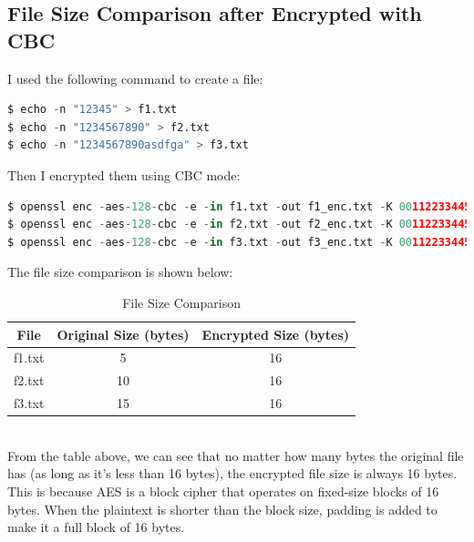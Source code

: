 \documentclass{article}
\begin{document}
\subsection{File Size Comparison after Encrypted with CBC}
I used the following command to create a file:
\begin{lstlisting}[language=Python]
$ echo -n "12345" > f1.txt
$ echo -n "1234567890" > f2.txt
$ echo -n "1234567890asdfga" > f3.txt
\end{lstlisting}
Then I encrypted them using CBC mode:
\begin{lstlisting}[language=Python]
$ openssl enc -aes-128-cbc -e -in f1.txt -out f1_enc.txt -K 00112233445566778889aabbccddeeff -iv 0102030405060708090a0b0c0d0e0f10
$ openssl enc -aes-128-cbc -e -in f2.txt -out f2_enc.txt -K 00112233445566778889aabbccddeeff -iv 0102030405060708090a0b0c0d0e0f10
$ openssl enc -aes-128-cbc -e -in f3.txt -out f3_enc.txt -K 00112233445566778889aabbccddeeff -iv 0102030405060708090a0b0c0d0e0f10
\end{lstlisting}
The file size comparison is shown below:
\begin{table}[h]
\centering
\begin{tabular}{|c|c|c|}
\hline
\textbf{File} & \textbf{Original Size (bytes)} & \textbf{Encrypted Size (bytes)} \\
\hline
f1.txt & 5 & 16 \\
\hline
f2.txt & 10 & 16 \\
\hline
f3.txt & 15 & 16 \\
\hline
\end{tabular}
\caption{File Size Comparison}
\end{table}\\
From the table above, we can see that no matter how many bytes the original file has (as long as it's less than 16 bytes),
the encrypted file size is always 16 bytes. This is because AES is a block cipher that operates on fixed-size blocks of 16 bytes.
When the plaintext is shorter than the block size, padding is added to make it a full block of 16 bytes.
\end{document}
